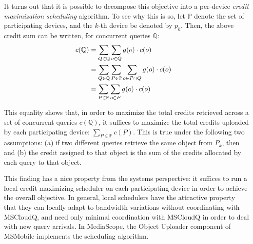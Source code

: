 It turns out that it is possible to decompose this objective into a
per-device \emph{credit maximization scheduling} algorithm.
%
To see why this is so, let $\mathbb{P}$ denote the set of
participating devices, and the $k$-th device be denoted by $p_k$.
%
Then, the above credit sum can be written, for concurrent queries $\mathbb{Q}$:
%
\begin{align*} \small
c(\mathbb{Q})&=\sum_{Q\in \mathbb{Q}}\sum_{o\in Q}g(o)\cdot c(o)&\\
&=\sum_{Q\in \mathbb{Q}}\sum_{P\in \mathbb{P}}\sum_{o\in P\cap Q}g(o)\cdot c(o)&\\
&=\sum_{P\in \mathbb{P}}\sum_{o\in P}g(o)\cdot c(o)&\\
\end{align*}

This equality shows that, in order to maximize the total credits
retrieved across a set of concurrent queries $c(\mathbb{Q})$, it
suffices to maximize the total credits uploaded by each participating
device: $\sum_{P\in \mathbb{P}}c(P)$.
%
This is true under the following two assumptions:
(a) if two different queries retrieve the same object from $P_k$, then
 and
(b) the credit assigned to that object is the sum of the credits
allocated by each query to that object.
%

This finding has a nice property from the systems perspective: it
suffices to run a local credit-maximizing scheduler on  each
participating device in order to achieve the overall objective.
%
In general, local schedulers have the attractive property that they
can locally adapt to bandwidth variations without coordinating with
MSCloudQ, and need only minimal coordination with MSCloudQ in order to
deal with new query arrivals.
%
In MediaScope, the Object Uploader component of MSMobile implements
the scheduling algorithm.

